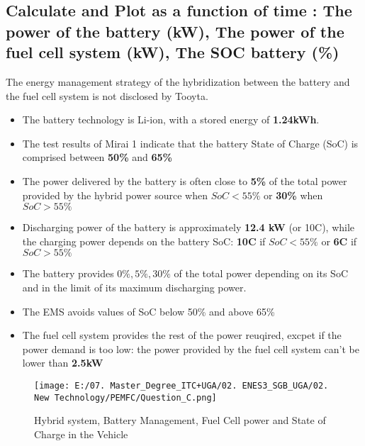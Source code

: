 \documentclass[12pt,a4paper]{article}
\numberwithin{equation}{section}
\begin{document}
{	
	
	
	
	





\subsection{Calculate and Plot as a function of time : The power of the battery (kW), The power of the fuel cell system (kW), The SOC battery (\%) }	

The energy management strategy of the hybridization between the battery and the fuel cell system is not disclosed by Tooyta. 
\begin{itemize}
	\item The battery technology is Li-ion, with a stored energy of \textbf{1.24kWh}.
	\item The test results of Mirai 1 indicate that the battery State of Charge (SoC) is comprised between \textbf{50\%} and \textbf{65\%}
	\item The power delivered by the battery is often close to \textbf{5\%} of the total power provided by the hybrid power source when $SoC < 55\%$ or \textbf{30\%} when $SoC > 55\%$
	\item Discharging power of the battery is approximately \textbf{12.4 kW} (or 10C), while the charging power depends on the battery SoC: \textbf{10C} if $SoC < 55\%$ or \textbf{6C} if $SoC > 55\%$
	\item The battery provides $0\%, 5\%, 30\%$ of the total power depending on its SoC and in the limit of its maximum discharging power.
	\item The EMS avoids values of SoC below 50\% and above 65\%
	\item The fuel cell system provides the rest of the power reuqired, excpet if the power demand is too low: the power provided by the fuel cell system can't be lower than \textbf{2.5kW}
\end{itemize}  

	\begin{figure}[h]
	\centering 
	\texttt{[image: E:/07. Master\_Degree\_ITC+UGA/02. ENES3\_SGB\_UGA/02. New Technology/PEMFC/Question\_C.png]}
	\caption{\small {Hybrid system, Battery Management, Fuel Cell power and State of Charge in the Vehicle}}
	\label{8}
	\end{figure}

}
\end{document}
